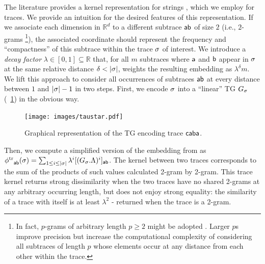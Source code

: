 The literature provides a kernel representation for strings \cite{LodhiSSCW02,GartnerFW03}, which we employ for
traces. We provide an intuition for the desired features of this representation. If we associate each dimension in $\mathbb{R}^d$
to a different subtrace $\mathsf{a}\mathsf{b}$ of size $2$ (i.e., $2$-grams%
\footnote{In fact, $p$-grams of arbitrary length $p\geq 2$ might be adopted \cite{Gartner03}. Larger $p$s improve precision
but increase the computational complexity of considering all subtraces of length $p$ whose elements occur at any
distance from each other within the trace.}),
the associated coordinate should represent the frequency and ``compactness'' of this subtrace within the trace $\sigma$ of
interest. We introduce a \emph{decay factor} $\lambda\in[0,1]\subseteq\mathbb{R}$ that, for all $m$ subtraces where $\mathsf{a}$ and $\mathsf{b}$ appear in $\sigma$ at the same relative distance $\delta < |\sigma|$, weights the resulting embedding as $\lambda^\delta m$.
%
We lift this approach to consider all occurrences of subtraces $\mathsf{a}\mathsf{b}$ at every distance between $1$ and $|\sigma|-1$
in two steps. First, we encode $\sigma$ into a ``linear'' TG $G_\sigma$ (\figurename~\ref{fig:taustar}) in the obvious way.
%
\begin{figure}[!t]
	\centering
	\texttt{[image: images/taustar.pdf]}
	\caption{Graphical representation of the TG encoding trace $\mathsf{caba}$.}
	\label{fig:taustar}
\end{figure}
%
Then, we compute a simplified version of the embedding from \cite{LodhiSSCW02} as
${\phi^{\text{tr}}}_{\mathsf{a}\mathsf{b}}(\sigma)=\sum_{1\leq i\leq |\sigma|}\lambda^i[(G_{\sigma}.\Lambda)^i]_{\mathsf{a}\mathsf{b}}$.
The kernel between two traces corresponds to the sum of the products of such values calculated 2-gram by 2-gram. This trace kernel returns strong dissimilarity when the two traces have no shared 2-grams at any arbitrary occurring length,
but does not enjoy strong equality: the similarity of a trace with itself is at least $\lambda^2$ - returned when the trace is a
2-gram.

%


